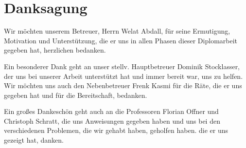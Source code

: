 \chapter*{Danksagung}

Wir möchten unserem Betreuer, Herrn Welat Abdall, für seine Ermutigung, Motivation und Unterst\"utzung, die er uns in allen Phasen dieser Diplomarbeit gegeben hat, herzlichen bedanken. 

Ein besonderer Dank geht an unser stellv. Hauptbetreuer Dominik Stocklasser, der uns bei unserer Arbeit unterstützt hat und immer bereit war, uns zu helfen. Wir möchten uns auch den Nebenbetreuer Frenk Kasmi f\"ur die Räte, die er uns gegeben hat und für die Bereitschaft, bedanken.  

Ein großes Dankeschön geht auch an die Professoren Florian Offner und Christoph Schratt, die uns Anweisungen gegeben haben und uns bei den verschiedenen Problemen, die wir gehabt haben, geholfen haben.
  die er uns gezeigt hat, danken.